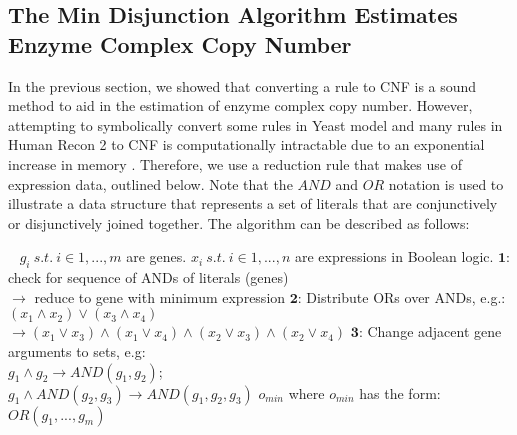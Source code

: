 \subsection{The Min Disjunction Algorithm Estimates \\Enzyme Complex Copy Number}

In the previous section, we showed that converting a rule to CNF is a
sound method to aid in the estimation of enzyme complex copy number.
However, attempting to symbolically convert some rules in Yeast model and
many rules in Human Recon 2 to CNF is computationally intractable due
to an exponential increase in memory \citep{Russell2009}. Therefore,
we use a reduction rule that makes use of expression data, outlined
below.  Note that the $AND$ and $OR$ notation is used to illustrate a
data structure that represents a set of literals that are
conjunctively or disjunctively joined together. The algorithm can be
described as follows:

\begin{AlgFloat}[H]
\begin{Algorithm}
\label{alg:ReductionToCNF}
\begin{algorithmic}
~
\REQUIRE $g_i~s.t.~i \in{1, ..., m}$ are genes. 
\REQUIRE $x_i~s.t.~i \in{1, ..., n}$ are expressions in Boolean logic.
  \STATE $\mathbf{1}$: check for sequence of ANDs of literals (genes)\\ 
    \hspace{4.8 mm} $\rightarrow$ reduce to gene with minimum expression 
  \STATE $\mathbf{2}$: Distribute ORs over ANDs, e.g.: $(x_1 \land x_2) \lor (x_3 \land x_4)$ \\ 
    \hspace{4.8 mm} $\rightarrow (x_1 \lor x_3) \land (x_1 \lor x_4) \land (x_2 \lor x_3) \land (x_2 \lor x_4)$
  \STATE $\mathbf{3}$: Change adjacent gene arguments to sets, e.g: \\
    \hspace{4.8 mm} $g_1 \land g_2 \rightarrow AND(g_1,g_2)$;  \\
    \hspace{4.8 mm} $g_1 \land AND(g_2,g_3) \rightarrow AND(g_1,g_2,g_3)$ 
\ENDWHILE
\ENSURE $o_{min}$ where $o_{min}$ has the form: $OR(g_1,...,g_m)$
\end{algorithmic} 
\end{Algorithm}
\end{AlgFloat}

